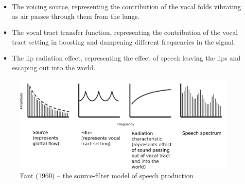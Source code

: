 \documentclass{article}\usepackage[]{graphicx}\usepackage[]{color}
\begin{document}
\begin{itemize}
\item{The voicing source, representing the contribution of the vocal folds vibrating as air passes through them from the lungs.}
\item{The vocal tract transfer function, representing the contribution of the vocal tract setting in boosting and dampening different frequencies in the signal.}
\item{The lip radiation effect, representing the effect of speech leaving the lips and escaping out into the world.}
\end{itemize}
\begin{figure}[!ht]
\centering
\includegraphics[scale=0.6,keepaspectratio]{fant.png}
\caption{Fant (1960) -- the source-filter model of speech production}
\end{figure}
\end{document}
